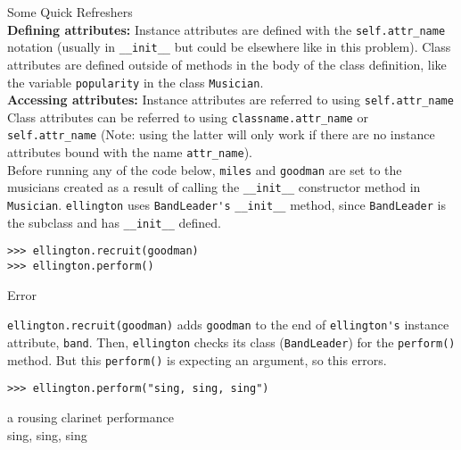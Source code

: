 \begin{blocksection}
\begin{solution}
Some Quick Refreshers \\
\textbf{Defining attributes:} Instance attributes are defined with the \lstinline{self.attr_name} notation (usually in \lstinline{__init__} but could be elsewhere like in this problem).
Class attributes are defined outside of methods in the body of the class definition, like the variable \lstinline{popularity} in the class \lstinline{Musician}. \\
\textbf{Accessing attributes:}
Instance attributes are referred to using \lstinline{self.attr_name} Class attributes can be referred to using \lstinline{classname.attr_name} or \lstinline{self.attr_name} (Note: using the latter will only work if there are no instance attributes bound with the name \lstinline{attr_name}). \\

Before running any of the code below, \lstinline{miles} and \lstinline{goodman} are set to the musicians created as a result of calling the \lstinline{__init__} constructor method in \lstinline{Musician}. \lstinline{ellington} uses \lstinline{BandLeader's} \lstinline{__init__} method, since \lstinline{BandLeader} is the subclass and has \lstinline{__init__} defined.
\end{solution}

\begin{lstlisting}
>>> ellington.recruit(goodman)
>>> ellington.perform()
\end{lstlisting}
\begin{solution}[.2in]
Error

\lstinline{ellington.recruit(goodman)} adds \lstinline{goodman} to the end of \lstinline{ellington's} instance attribute, \lstinline{band}. Then, \lstinline{ellington} checks its class (\lstinline{BandLeader}) for the \lstinline{perform()} method. But this \lstinline{perform()} is expecting an argument, so this errors.
\end{solution}

\vspace{1\baselineskip}

\begin{lstlisting}
>>> ellington.perform("sing, sing, sing")
\end{lstlisting}
\begin{solution}[.2in]
a rousing clarinet performance \\
sing, sing, sing


\end{solution}
\end{blocksection}
